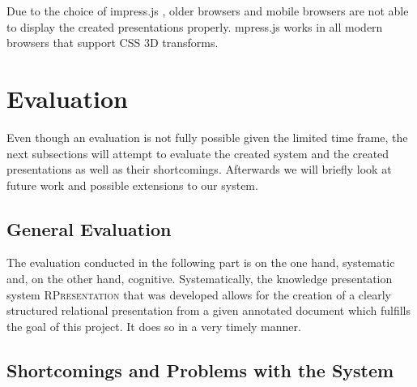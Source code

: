 \documentclass[twoside, 12pt]{article}
\newcommand{\sys}{\textsc{RPresentation}\xspace}
\begin{document}
Due to the choice of impress.js \cite{JSImpress:npentrel14}, older browsers and mobile browsers are not able to display the created presentations properly. mpress.js works in all modern browsers that support CSS 3D transforms.

\section{Evaluation}
\label{sec:eval}

Even though an evaluation is not fully possible given the limited time frame, the next subsections will attempt to evaluate the created system and the created presentations as well as their shortcomings. Afterwards we will briefly look at future work and possible extensions to our system.

\subsection{General Evaluation}

The evaluation conducted in the following part is on the one hand, systematic and, on the other hand, cognitive. Systematically, the knowledge presentation system \sys that was developed allows for the creation of a clearly structured relational presentation from a given annotated document which fulfills the goal of this project. It does so in a very timely manner.




\subsection{Shortcomings and Problems with the System}
\end{document}
